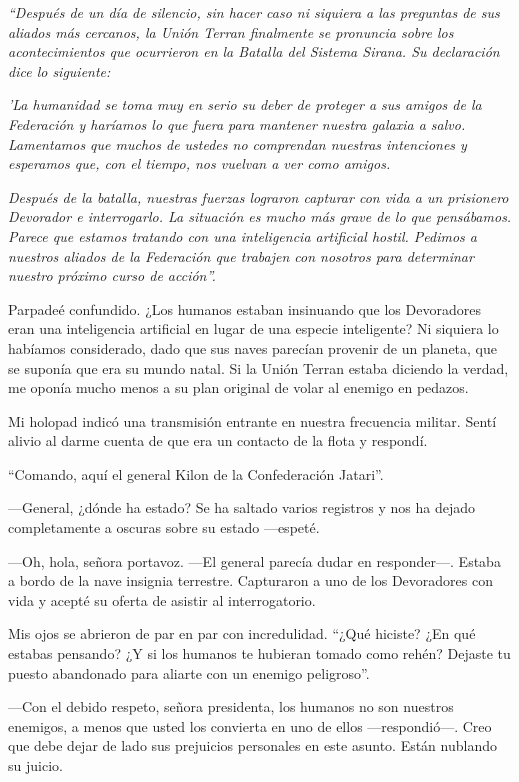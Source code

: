 \textit{“Después de un día de silencio, sin hacer caso ni siquiera a las preguntas de sus aliados más cercanos, la Unión Terran finalmente se pronuncia sobre los acontecimientos que ocurrieron en la Batalla del Sistema Sirana. Su declaración dice lo siguiente:}

\textit{'La humanidad se toma muy en serio su deber de proteger a sus amigos de la Federación y haríamos lo que fuera para mantener nuestra galaxia a salvo. Lamentamos que muchos de ustedes no comprendan nuestras intenciones y esperamos que, con el tiempo, nos vuelvan a ver como amigos.}

\textit{Después de la batalla, nuestras fuerzas lograron capturar con vida a un prisionero Devorador e interrogarlo. La situación es mucho más grave de lo que pensábamos. Parece que estamos tratando con una inteligencia artificial hostil. Pedimos a nuestros aliados de la Federación que trabajen con nosotros para determinar nuestro próximo curso de acción”.}

Parpadeé confundido. ¿Los humanos estaban insinuando que los Devoradores eran una inteligencia artificial en lugar de una especie inteligente? Ni siquiera lo habíamos considerado, dado que sus naves parecían provenir de un planeta, que se suponía que era su mundo natal. Si la Unión Terran estaba diciendo la verdad, me oponía mucho menos a su plan original de volar al enemigo en pedazos.

Mi holopad indicó una transmisión entrante en nuestra frecuencia militar. Sentí alivio al darme cuenta de que era un contacto de la flota y respondí.

“Comando, aquí el general Kilon de la Confederación Jatari”.

—General, ¿dónde ha estado? Se ha saltado varios registros y nos ha dejado completamente a oscuras sobre su estado —espeté.

—Oh, hola, señora portavoz. —El general parecía dudar en responder—. Estaba a bordo de la nave insignia terrestre. Capturaron a uno de los Devoradores con vida y acepté su oferta de asistir al interrogatorio.

Mis ojos se abrieron de par en par con incredulidad. “¿Qué hiciste? ¿En qué estabas pensando? ¿Y si los humanos te hubieran tomado como rehén? Dejaste tu puesto abandonado para aliarte con un enemigo peligroso”.

—Con el debido respeto, señora presidenta, los humanos no son nuestros enemigos, a menos que usted los convierta en uno de ellos —respondió—. Creo que debe dejar de lado sus prejuicios personales en este asunto. Están nublando su juicio.

